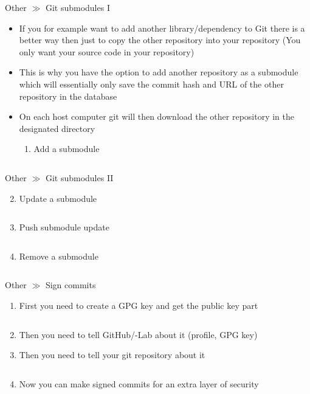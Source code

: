 \documentclass[10pt]{beamer}
\begin{document}
\begin{frame}{Other $\gg$ Git submodules I}
\begin{itemize}
	\item If you for example want to add another library/dependency to Git there is a better way then just to copy the other repository into your repository (You only want your source code in your repository)
	\item This is why you have the option to add another repository as a submodule which will essentially only save the commit hash and URL of the other repository in the database
	\item On each host computer git will then download the other repository in the designated directory
	\begin{enumerate}
		\item Add a submodule
		\inputminted[bgcolor=lightGreyCustom,fontsize=\scriptsize]{sh}{./resources/git_submodule_01_add.sh}
	\end{enumerate}
\end{itemize}
\end{frame}

\begin{frame}{Other $\gg$ Git submodules II}
	\begin{enumerate}\setcounter{enumi}{1}
		\item Update a submodule
		\inputminted[bgcolor=lightGreyCustom,fontsize=\scriptsize]{sh}{./resources/git_submodule_02_update.sh}
		\item Push submodule update
		\inputminted[bgcolor=lightGreyCustom,fontsize=\scriptsize]{sh}{./resources/git_submodule_03_push_update.sh}
		\item Remove a submodule
		\inputminted[bgcolor=lightGreyCustom,fontsize=\scriptsize]{sh}{./resources/git_submodule_04_remove.sh}
	\end{enumerate}
\end{frame}

\begin{frame}{Other $\gg$ Sign commits}
\begin{enumerate}
	\item First you need to create a GPG key and get the public key part
	\inputminted[bgcolor=lightGreyCustom,fontsize=\scriptsize]{sh}{./resources/git_sign_commits_01_gpg_key.sh}
	\item Then you need to tell GitHub/-Lab about it (profile, GPG key)
	\item Then you need to tell your git repository about it
	\inputminted[bgcolor=lightGreyCustom,fontsize=\scriptsize]{sh}{./resources/git_sign_commits_02_register_key.sh}
	\item Now you can make signed commits for an extra layer of security
	\inputminted[bgcolor=lightGreyCustom,fontsize=\scriptsize]{sh}{./resources/git_sign_commits_03_signed_commit.sh}
\end{enumerate}
\end{frame}
\end{document}

